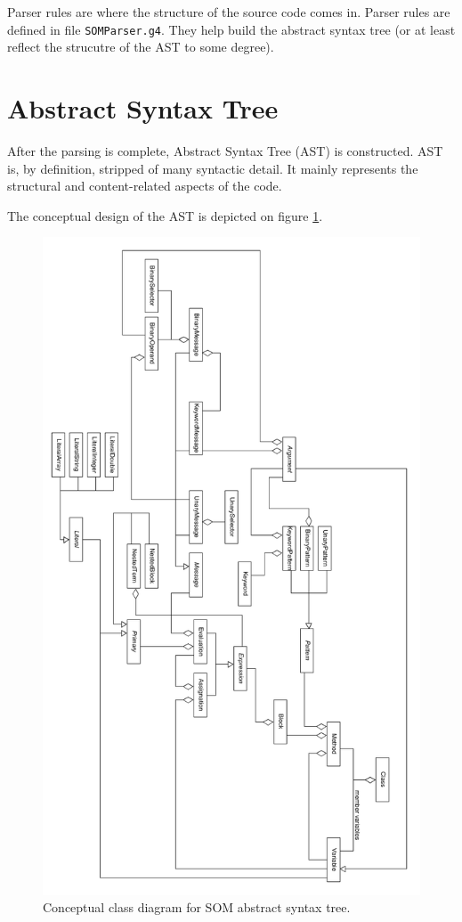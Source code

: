 \documentclass[thesis=M,english]{FITthesis}[2019/12/23]
\begin{document}
Parser rules are where the structure of the source code comes in. Parser rules are defined in file \texttt{SOMParser.g4}. They
help build the abstract syntax tree (or at least reflect the strucutre of the AST to some degree). 


\section{Abstract Syntax Tree}
After the parsing is complete, Abstract Syntax Tree (AST) is constructed. AST is, by definition, stripped of many syntactic detail.
It mainly represents the structural and content-related aspects of the code.

The conceptual design of the AST is depicted on figure \ref{fig:ast_class_concept}.

\begin{figure}[hp!]
	\centering
	\includegraphics[width=\textwidth, height=\textheight]{media/ast/ast_concept.png}
	\caption{Conceptual class diagram for SOM abstract syntax tree.}
	\label{fig:ast_class_concept}
\end{figure}
\end{document}
